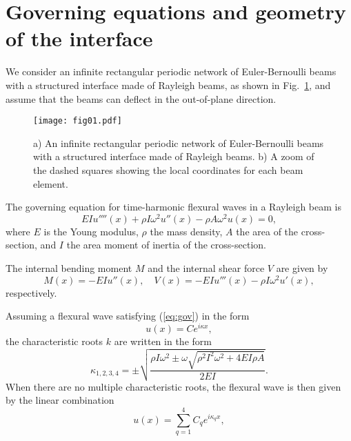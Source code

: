 \documentclass[11pt]{article}
\begin{document}
\section{Governing equations and geometry of the interface}
\label{sec02}

We consider an infinite rectangular periodic network of Euler-Bernoulli beams with a structured interface made of Rayleigh beams, as shown in Fig.~\ref{fig01}, and assume that the beams can deflect in the out-of-plane direction.

\begin{figure}[!htb]
\centering
\texttt{[image: fig01.pdf]}
\caption{\footnotesize a) An infinite rectangular periodic network of Euler-Bernoulli beams with a structured interface made of Rayleigh beams. b) A zoom of the dashed squares showing the local coordinates for each beam element.}
\label{fig01}
\end{figure}

The governing equation for time-harmonic flexural waves in a Rayleigh beam is
%
\begin{equation}
\label{eq:gov}
EI u''''(x) + \rho I \omega^2 u''(x)  - \rho A \omega^2 u(x) = 0,
\end{equation}
%
where $E$ is the Young modulus,  $\rho$ the mass density, $A$ the area of the cross-section, and $I$ the area moment of inertia of the cross-section. 

The internal bending moment $M$ and the internal shear force $V$ are given by
%
\begin{equation}
M(x) = -EI u''(x), \quad V(x) = -EI u'''(x)  - \rho I \omega^2 u'(x),
\end{equation}
%
respectively.

Assuming a flexural wave satisfying (\ref{eq:gov})  in the form
%
\begin{equation}
u(x) = C e^{i \kappa x},
\end{equation}
%
the characteristic roots $k$ are written in the form
%
\begin{equation}
\kappa_{1,2,3,4} = \pm \sqrt{\frac{\rho I\omega^2 \pm \omega\sqrt{\rho^2I^2\omega^2+4EI\rho A}}{2 EI}}.
\end{equation}
%
When there are no multiple characteristic roots, the flexural wave is then given by the linear combination
%
\begin{equation}
u(x) = \sum_{q=1}^{4} C_q e^{i \kappa_q x},
\end{equation}
\end{document}
